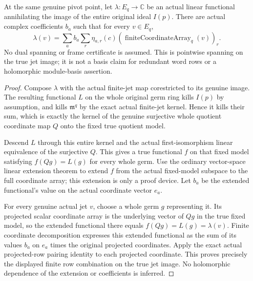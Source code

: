 \begin{theorem}
\label{hir:actual-projected-dual-rows-span-whole-true-jet-annihilator}
\leanok
At the same genuine pivot point, let $\lambda:E_q\to\mathbb C$ be an
actual linear functional annihilating the image of the entire
original ideal $I(p)$. There are actual complex coefficients $b_a$
such that for every $v\in E_q$,
\[
 \lambda(v)=\sum_a b_a\sum_r\eta_{a,r}(c)
   (\operatorname{finiteCoordinateArray}_q(v))_r.
\]
No dual spanning or frame certificate is assumed. This is pointwise
spanning on the true jet image; it is not a basis claim for redundant
word rows or a holomorphic module-basis assertion.
\end{theorem}
\begin{proof}
Compose $\lambda$ with the actual finite-jet map corestricted to its
genuine image. The resulting functional $L$ on the whole original
germ ring kills $I(p)$ by assumption, and kills $\mathfrak m^q$ by
the exact actual finite-jet kernel. Hence it kills their sum, which
is exactly the kernel of the genuine surjective whole quotient
coordinate map $Q$ onto the fixed true quotient model.

Descend $L$ through this entire kernel and the actual first-isomorphism
linear equivalence of the surjective $Q$. This gives a true functional
$f$ on that fixed model satisfying $f(Qg)=L(g)$ for every whole germ.
Use the ordinary vector-space linear extension theorem to extend $f$
from the actual fixed-model subspace to the full coordinate array;
this extension is only a proof device. Let $b_a$ be the extended
functional's value on the actual coordinate vector $e_a$.

For every genuine actual jet $v$, choose a whole germ $g$ representing
it. Its projected scalar coordinate array is the underlying vector of
$Qg$ in the true fixed model, so the extended functional there equals
$f(Qg)=L(g)=\lambda(v)$. Finite coordinate decomposition expresses
this extended functional as the sum of its values $b_a$ on $e_a$
times the original projected coordinates. Apply the exact actual
projected-row pairing identity to each projected coordinate. This
proves precisely the displayed finite row combination on the true
jet image. No holomorphic dependence of the extension or coefficients
is inferred.
\end{proof}

